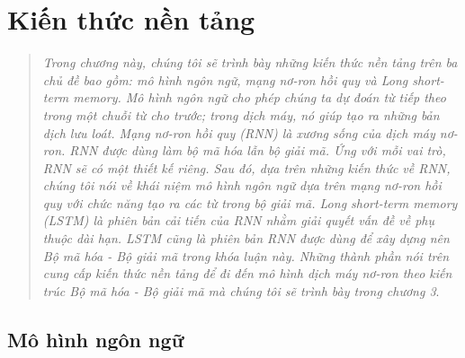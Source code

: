 \chapter{Kiến thức nền tảng}
\ifpdf
    \graphicspath{{Chapter2/Chapter2Figs/PNG/}{Chapter2/Chapter2Figs/PDF/}{Chapter2/Chapter2Figs/}}
\else
    \graphicspath{{Chapter2/Chapter2Figs/EPS/}{Chapter2/Chapter2Figs/}}
\fi
\label{chap_2}
\begin{quote}

\textit{Trong chương này, chúng tôi sẽ trình bày những kiến thức nền tảng trên ba chủ đề bao gồm: mô hình ngôn ngữ, mạng nơ-ron hồi quy và Long short-term memory. Mô hình ngôn ngữ cho phép chúng ta dự đoán từ tiếp theo trong một chuỗi từ cho trước; trong dịch máy, nó giúp tạo ra những bản dịch lưu loát. Mạng nơ-ron hồi quy (RNN) là xương sống của dịch máy nơ-ron. RNN được dùng làm bộ mã hóa lẫn bộ giải mã. Ứng với mỗi vai trò, RNN sẽ có một thiết kế riêng. Sau đó, dựa trên những kiến thức về RNN, chúng tôi nói về khái niệm mô hình ngôn ngữ dựa trên mạng nơ-ron hồi quy với chức năng tạo ra các từ trong bộ giải mã. Long short-term memory (LSTM) là phiên bản cải tiến của RNN nhằm giải quyết vấn đề về phụ thuộc dài hạn. LSTM cũng là phiên bản RNN được dùng để xây dựng nên Bộ mã hóa - Bộ giải mã trong khóa luận này. Những thành phần nói trên cung cấp kiến thức nền tảng để đi đến mô hình dịch máy nơ-ron theo kiến trúc Bộ mã hóa - Bộ giải mã mà chúng tôi sẽ trình bày trong chương 3}.


\end{quote}

\section{Mô hình ngôn ngữ}

